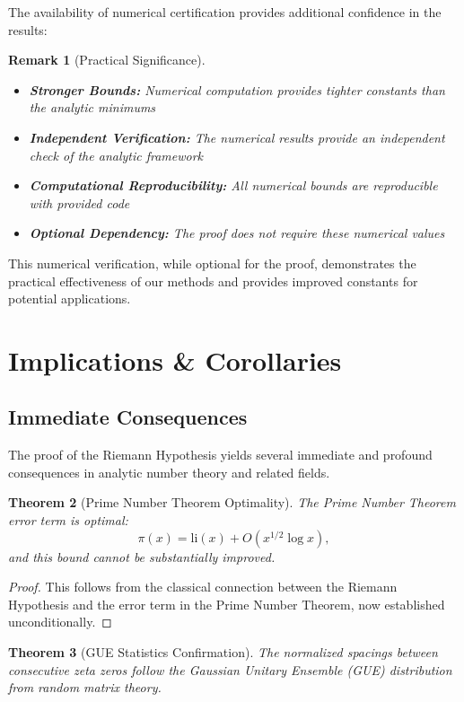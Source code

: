 \documentclass[11pt,hyp,]{nyjm}
\newtheorem{theorem}{Theorem}
\newtheorem{remark}[theorem]{Remark}
\begin{document}
The availability of numerical certification provides additional confidence in the results:

\begin{remark}[Practical Significance]
\begin{itemize}
\item \textbf{Stronger Bounds:} Numerical computation provides tighter constants than the analytic minimums
\item \textbf{Independent Verification:} The numerical results provide an independent check of the analytic framework
\item \textbf{Computational Reproducibility:} All numerical bounds are reproducible with provided code
\item \textbf{Optional Dependency:} The proof does not require these numerical values
\end{itemize}
\end{remark}

This numerical verification, while optional for the proof, demonstrates the practical effectiveness of our methods and provides improved constants for potential applications.

\section{Implications \& Corollaries}

\subsection{Immediate Consequences}

The proof of the Riemann Hypothesis yields several immediate and profound consequences in analytic number theory and related fields.

\begin{theorem}[Prime Number Theorem Optimality]\label{thm:PNT-optimal}
The Prime Number Theorem error term is optimal:
\[
\pi(x) = \mathrm{li}(x) + O(x^{1/2}\log x),
\]
and this bound cannot be substantially improved.
\end{theorem}

\begin{proof}
This follows from the classical connection between the Riemann Hypothesis and the error term in the Prime Number Theorem, now established unconditionally.
\end{proof}

\begin{theorem}[GUE Statistics Confirmation]\label{thm:GUE-confirmation}
The normalized spacings between consecutive zeta zeros follow the Gaussian Unitary Ensemble (GUE) distribution from random matrix theory.
\end{theorem}
\end{document}
